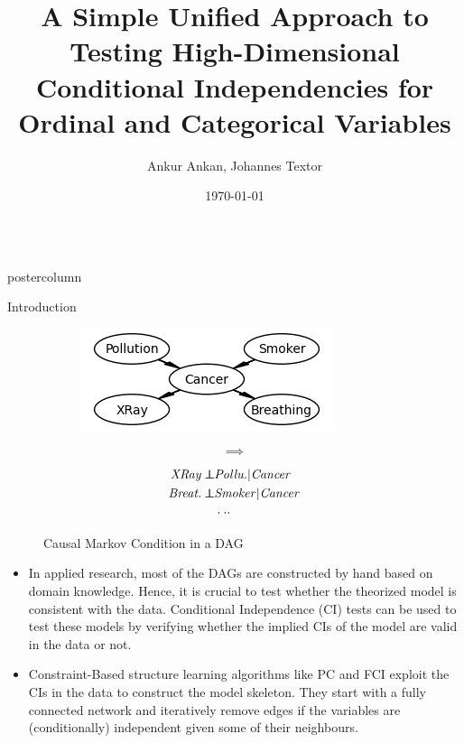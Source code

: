 \documentclass{beamer}
\title{\huge A Simple Unified Approach to Testing High-Dimensional Conditional Independencies for Ordinal and Categorical Variables}
\author{Ankur Ankan, Johannes Textor}
\institute[RU]{Institute for Computing and Information Sciences \\ Radboud University, Netherlands}
\date{\today}
\def\ci{\perp\!\!\!\!\!\perp}
\newlength{\columnheight}
\begin{document}
\begin{frame}
\begin{columns}
	\begin{column}{.33\textwidth}
		\begin{beamercolorbox}[center]{postercolumn}
			\begin{minipage}{.98\textwidth}  %
				\parbox[t][\columnheight]{\textwidth}{ %
	\begin{myblock}{Introduction}
		\begin{figure}
			\begin{subfigure}{0.4\textwidth}
				\centering
				\includegraphics[scale=1.5]{../in_person/imgs/example_dag.png}
			\end{subfigure}\hfill%
			\begin{subfigure}{0.1\textwidth}
				$$ \bm{\implies} $$
			\end{subfigure}\hfill%
			\begin{subfigure}{0.45\textwidth}
				\begin{equation*}
					\begin{split}
						\text{\emph{XRay}} \ci & \text{\emph{Pollu.}} | \text{\emph{Cancer}} \\
						\text{\emph{Breat.}} \ci & \text{\emph{Smoker}} | \text{\emph{Cancer}} \\
						& \cdot \cdot \cdot \\
					\end{split}
				\end{equation*}
			\end{subfigure}
			\caption*{Causal Markov Condition in a DAG \footnotemark}
		\end{figure}

		\begin{itemize}
			\item In applied research, most of the DAGs are constructed by
				hand based on domain knowledge. Hence, it is crucial 
				to test whether the theorized model is consistent with
				the data. Conditional Independence (CI) tests can be
				used to test these models by verifying whether the
				implied CIs of the model are valid in the data or not.
			\item Constraint-Based structure learning algorithms like PC and FCI exploit
				the CIs in the data to construct the model skeleton. They start with
				a fully connected network and iteratively remove edges if the variables 
				are (conditionally) independent given some of their neighbours.
		\end{itemize}


\end{myblock}}
\end{minipage}
\end{beamercolorbox}
\end{column}
\end{columns}
\end{frame}
\end{document}
